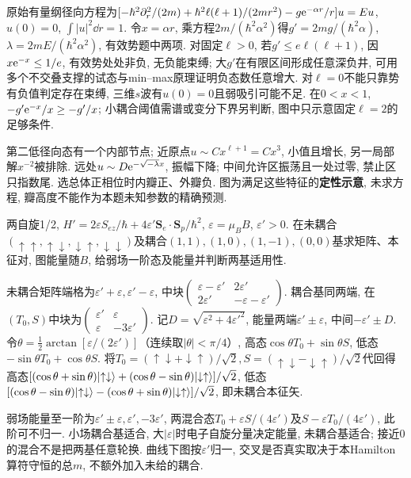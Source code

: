 \begin{solution}
原始有量纲径向方程为$[-\hbar^2\partial_r^2/(2m)+\hbar^2\ell(\ell+1)/(2mr^2)-g\mathrm e^{-\alpha r}/r]u=Eu$, $u(0)=0$, $\int|u|^2\dd r=1$. 令$x=\alpha r$, 乘方程$2m/(\hbar^2\alpha^2)$得$g'=2mg/(\hbar^2\alpha)$,$\lambda=2mE/(\hbar^2\alpha^2)$, 有效势题中两项. 对固定$\ell>0$, 若$g'\le e\ell(\ell+1)$, 因$x\mathrm e^{-x}\le1/e$, 有效势处处非负, 无负能束缚; 大$g'$在有限区间形成任意深负井, 可用多个不交叠支撑的试态与min--max原理证明负态数任意增大. 对$\ell=0$不能只靠势有负值判定存在束缚, 三维$s$波有$u(0)=0$且弱吸引可能不足. 在$0<x<1$,$-g'\mathrm e^{-x}/x\ge-g'/x$; 小耦合阈值需谱或变分下界另判断, 图中只示意固定$\ell=2$的足够条件.

第二低径向态有一个内部节点; 近原点$u\sim Cx^{\ell+1}=Cx^3$, 小值且增长, 另一局部解$x^{-2}$被排除. 远处$u\sim D\mathrm e^{-\sqrt{-\lambda}x}$, 振幅下降; 中间允许区振荡且一处过零, 禁止区只指数尾. 选总体正相位时内瓣正、外瓣负. 图为满足这些特征的\textbf{定性示意}, 未求方程, 瓣高度不能作为本题未知参数的精确预测.

\end{solution}
\begin{exercise}
两自旋1/2, $H'=2\varepsilon S_{ez}/\hbar+4\varepsilon'\boldsymbol S_e\cdot\boldsymbol S_p/\hbar^2$, $\varepsilon=\mu_BB$, $\varepsilon'>0$. 在未耦合$(\uparrow\uparrow,\uparrow\downarrow,\downarrow\uparrow,\downarrow\downarrow)$及耦合$(1,1),(1,0),(1,-1),(0,0)$基求矩阵、本征对, 图能量随$B$, 给弱场一阶态及能量并判断两基适用性.
\end{exercise}
\begin{solution}
未耦合矩阵端格为$\varepsilon'+\varepsilon,\varepsilon'-\varepsilon$, 中块$\begin{pmatrix}\varepsilon-\varepsilon'&2\varepsilon'\\2\varepsilon'&-\varepsilon-\varepsilon'\end{pmatrix}$. 耦合基同两端, 在$(T_0,S)$中块为$\begin{pmatrix}\varepsilon'&\varepsilon\\\varepsilon&-3\varepsilon'\end{pmatrix}$. 记$D=\sqrt{\varepsilon^2+4\varepsilon'^2}$, 能量两端$\varepsilon'\pm\varepsilon$, 中间$-\varepsilon'\pm D$. 令$\theta=\frac12\arctan[\varepsilon/(2\varepsilon')]$（连续取$|\theta|<\pi/4$）, 高态$\cos\theta T_0+\sin\theta S$, 低态$-\sin\theta T_0+\cos\theta S$. 将$T_0=(\uparrow\downarrow+\downarrow\uparrow)/\sqrt2,S=(\uparrow\downarrow-\downarrow\uparrow)/\sqrt2$代回得高态$[(\cos\theta+\sin\theta)\lvert \uparrow\downarrow\rangle+(\cos\theta-\sin\theta)\lvert \downarrow\uparrow\rangle]/\sqrt2$, 低态$[(\cos\theta-\sin\theta)\lvert \uparrow\downarrow\rangle-(\cos\theta+\sin\theta)\lvert \downarrow\uparrow\rangle]/\sqrt2$, 即未耦合本征矢.

弱场能量至一阶为$\varepsilon'\pm\varepsilon,\varepsilon',-3\varepsilon'$, 两混合态$T_0+\varepsilon S/(4\varepsilon')$及$S-\varepsilon T_0/(4\varepsilon')$, 此阶可不归一. 小场耦合基适合, 大$|\varepsilon|$时电子自旋分量决定能量, 未耦合基适合; 接近0的混合不是把两基任意轮换. 曲线下图按$\varepsilon'$归一, 交叉是否真实取决于本Hamilton算符守恒的总$m$, 不额外加入未给的耦合.

\end{solution}
